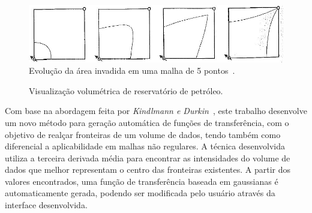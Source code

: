 \begin{figure}[h]
   	\centering
   	\includegraphics[width=1\textwidth]{images/reserv_livro}
   	\caption{Evolução da área invadida em uma malha de 5 pontos~\cite{rosa}.}
   	\label{fig:reserv_livro}
\end{figure}
    
\begin{figure}[h]
	\centering
    \caption{Visualização volumétrica de reservatório de petróleo.}
   	\label{fig:reserv}
\end{figure}
    
    Com base na abordagem feita por \textit{Kindlmann e Durkin}~\cite{gordon}, este trabalho desenvolve um novo método para geração automática de funções de transferência, com o objetivo de realçar fronteiras de um volume de dados, tendo também como diferencial a aplicabilidade em malhas não regulares. A técnica desenvolvida utiliza a terceira derivada média para encontrar as intensidades do volume de dados que melhor representam o centro das fronteiras existentes. A partir dos valores encontrados, uma função de transferência baseada em gaussianas é automaticamente gerada, podendo ser modificada pelo usuário através da interface desenvolvida.
    
